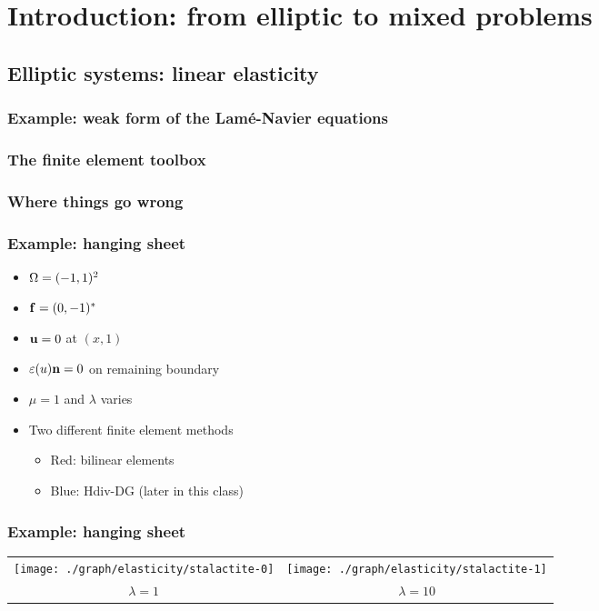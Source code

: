\documentclass[american,notheorems]{beamer}
\begin{document}
\section{Introduction: from elliptic to mixed problems}
\subsection{Elliptic systems: linear elasticity}
\subsubsection{Example: weak form of the Lamé-Navier equations}
\subsubsection{The finite element toolbox}
\subsubsection{Where things go wrong}

\begin{frame}
  \frametitle{Example: hanging sheet}
  \begin{itemize}
  \item $\Omega = (-1,1)^2$
  \item $\mathbf f = (0,-1)^*$
  \item $\mathbf u = 0$ at $(x,1)$
  \item $\varepsilon(u) \mathbf n = 0$ on remaining boundary
  \item $\mu=1$ and $\lambda$ varies
  \item Two different finite element methods
    \begin{itemize}
    \item Red: bilinear elements
    \item Blue: Hdiv-DG (later in this class)
    \end{itemize}
  \end{itemize}
\end{frame}

\begin{frame}
  \frametitle{Example: hanging sheet}
  \centering
  \begin{tabular}{cc}
    \texttt{[image: ./graph/elasticity/stalactite-0]}
    &\texttt{[image: ./graph/elasticity/stalactite-1]}
    \\
    $\lambda = 1$&$\lambda = 10$
  \end{tabular}
\end{frame}
\end{document}
